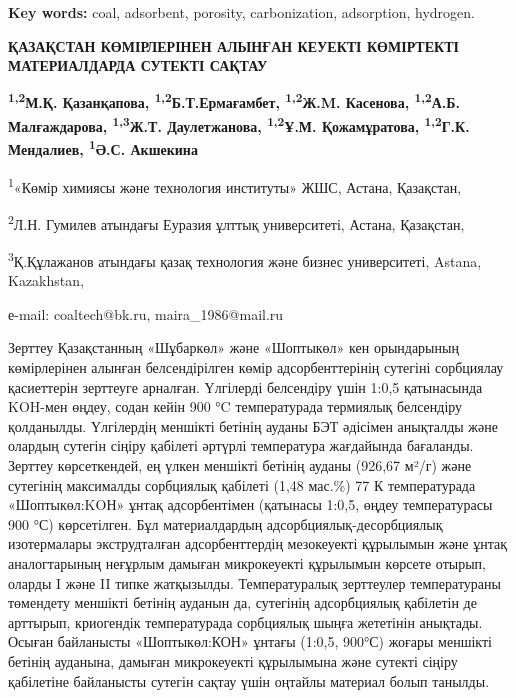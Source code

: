 {\bfseries Key words:} coal, adsorbent, porosity, carbonization,
adsorption, hydrogen.

\begin{articleheader}
{\bfseries ҚАЗАҚСТАН КӨМІРЛЕРІНЕН АЛЫНҒАН КЕУЕКТІ КӨМІРТЕКТІ МАТЕРИАЛДАРДА СУТЕКТІ САҚТАУ}

{\bfseries
\textsuperscript{1,2}М.Қ. Қазанқапова\textsuperscript{\envelope },
\textsuperscript{1,2}Б.Т.Ермағамбет,
\textsuperscript{1,2}Ж.M. Касенова,
\textsuperscript{1,2}А.Б. Малғаждарова,
\textsuperscript{1,3}Ж.Т. Даулетжанова,
\textsuperscript{1,2}Ұ.М. Қожамұратова,
\textsuperscript{1,2}Г.К. Мендалиев,
\textsuperscript{1}Ә.С. Акшекина
}
\end{articleheader}

\begin{affiliation}
\textsuperscript{1}«Көмір химиясы және технология институты» ЖШС, Астана, Қазақстан,

\textsuperscript{2}Л.Н. Гумилев атындағы Еуразия ұлттық университеті, Астана, Қазақстан,

\textsuperscript{3}Қ.Құлажанов атындағы қазақ технология және бизнес университеті, Astana, Kazakhstan,

е-mail: coaltech@bk.ru, maira\_1986@mail.ru
\end{affiliation}

Зерттеу Қазақстанның «Шұбаркөл» және «Шоптыкөл» кен орындарының
көмірлерінен алынған белсендірілген көмір адсорбенттерінің сутегіні
сорбциялау қасиеттерін зерттеуге арналған. Үлгілерді белсендіру үшін
1:0,5 қатынасында KOH-мен өңдеу, содан кейін 900 °C температурада
термиялық белсендіру қолданылды. Үлгілердің меншікті бетінің ауданы БЭТ
әдісімен анықталды және олардың сутегін сіңіру қабілеті әртүрлі
температура жағдайында бағаланды. Зерттеу көрсеткендей, ең үлкен
меншікті бетінің ауданы (926,67 м²/г) және сутегінің максималды
сорбциялық қабілеті (1,48 мас.\%) 77 К температурада «Шоптыкөл:KOН»
ұнтақ адсорбентімен (қатынасы 1:0,5, өңдеу температурасы 900 °С)
көрсетілген. Бұл материалдардың адсорбциялық-десорбциялық изотермалары
экструдталған адсорбенттердің мезокеуекті құрылымын және ұнтақ
аналогтарының неғұрлым дамыған микрокеуекті құрылымын көрсете отырып,
оларды I және II типке жатқызылды. Температуралық зерттеулер
температураны төмендету меншікті бетінің ауданын да, сутегінің
адсорбциялық қабілетін де арттырып, криогендік температурада сорбциялық
шыңға жететінін анықтады. Осыған байланысты «Шоптыкөл:КОН» ұнтағы
(1:0,5, 900°С) жоғары меншікті бетінің ауданына, дамыған микрокеуекті
құрылымына және сутекті сіңіру қабілетіне байланысты сутегін сақтау үшін
оңтайлы материал болып танылды.

